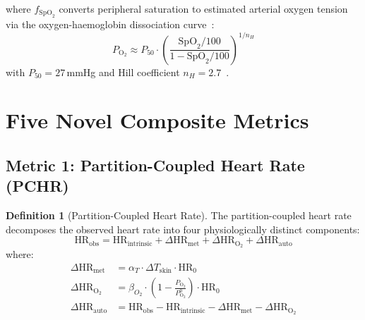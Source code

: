 \documentclass[10pt,twocolumn,a4paper]{article}
\theoremstyle{definition}
\newtheorem{definition}{Definition}
\begin{document}
where $f_{\text{SpO}_2}$ converts peripheral saturation to estimated
arterial oxygen tension via the oxygen-haemoglobin dissociation
curve~\cite{severinghaus1979simple}:
\begin{equation}
\label{eq:spo2_to_po2}
P_{\text{O}_2} \approx P_{50} \cdot \left(\frac{\text{SpO}_2/100}{1 - \text{SpO}_2/100}\right)^{1/n_H}
\end{equation}
with $P_{50} = 27$\,mmHg and Hill coefficient $n_H = 2.7$~\cite{perutz1970stereochemistry}.

\section{Five Novel Composite Metrics}
\label{sec:metrics}

\subsection{Metric 1: Partition-Coupled Heart Rate (PCHR)}

\begin{definition}[Partition-Coupled Heart Rate]
\label{def:pchr}
The partition-coupled heart rate decomposes the observed heart rate
into four physiologically distinct components:
\begin{equation}
\label{eq:pchr}
\boxed{
\text{HR}_{\text{obs}} = \text{HR}_{\text{intrinsic}}
+ \Delta\text{HR}_{\text{met}}
+ \Delta\text{HR}_{\text{O}_2}
+ \Delta\text{HR}_{\text{auto}}
}
\end{equation}
where:
\begin{align}
\Delta\text{HR}_{\text{met}} &= \alpha_T \cdot \Delta T_{\text{skin}}
\cdot \text{HR}_0 \label{eq:hr_met}\\
\Delta\text{HR}_{\text{O}_2} &= \beta_{O_2} \cdot
\left(1 - \frac{P_{\text{O}_2}}{P_{\text{O}_2}^0}\right)
\cdot \text{HR}_0 \label{eq:hr_o2}\\
\Delta\text{HR}_{\text{auto}} &= \text{HR}_{\text{obs}}
- \text{HR}_{\text{intrinsic}}
- \Delta\text{HR}_{\text{met}}
- \Delta\text{HR}_{\text{O}_2} \label{eq:hr_auto}
\end{align}
\end{definition}
\end{document}
